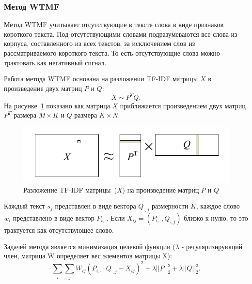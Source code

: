     \subsubsection{Метод WTMF}
    \label{subsubsec:wtmf}
        Метод WTMF учитывает отсутствующие в тексте слова в виде признаков короткого текста.
        Под отсутствующими словами подразумеваются все слова из корпуса, составленного из всех текстов, за исключением слов из рассматриваемого короткого текста.
        То есть отсутствующие слова можно трактовать как негативный сигнал.

        Работа метода WTMF основана на разложении TF-IDF матрицы $X$ в произведение двух матриц $P$ и $Q$:
        $$X \sim P^TQ.$$
        На рисунке~\ref{pic:wtmf} показано как матрица $X$ приближается произведением двух матриц $P^T$ размера $M \times K$ и $Q$ размера $K \times N$.

        \begin{figure}[h!]
            \center
            \includegraphics[scale=0.45]{wtmf.png}
            \caption{Разложение TF-IDF матрицы~($X$) на произведение матриц $P$ и $Q$}
            \label{pic:wtmf}
        \end{figure}

        Каждый текст $s_j$ представлен в виде вектора $Q_{\cdot,j}$ размерности $K$, каждое слово $w_i$ представлено в виде вектор $P_{i,\cdot}$.
        Если $X_{ij}=(P_{i,\cdot}, Q_{\cdot,j})$ близко к нулю, то это трактуется как отсутствующее слово.

        Задачей метода является минимизация целевой функции ($\lambda$ - регуляризирующий член, матрица W определяет вес элементов матрицы X):
        $$\sum_i \sum_j W_{ij} (P_{i,\cdot} \cdot Q_{\cdot,j} - X_{ij})^2 + \lambda ||P||^2_2 + \lambda ||Q||^2_2.$$


